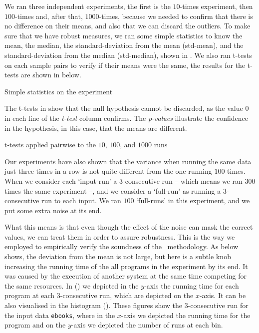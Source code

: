 We ran three independent experiments, the first is the $10$-times experiment, then $100$-times and, after that, $1000$-times, because we needed to confirm that there is no difference on their means, and also that we can discard the outliers. To make sure that we have robust measures, we ran some simple statistics to know the mean, the median, the standard-deviation from the mean (std-mean), and the standard-deviation from the median (std-median), shown in . We also ran t-tests on each sample pairs to verify if their means were the same, the results for the t-tests are shown in  below.

\begin{table}
  \centering
  \begin{tiny}
  
  \end{tiny}
  \caption{Simple statistics on the experiment}
  \label{tab:robustTest}
\end{table}

The t-tests in  show that the null hypothesis cannot be discarded, as the value $0$ in each line of the \emph{t-test} column confirms. The \emph{p-values} illustrate the confidence in the hypothesis, in this case, that the means are different.

\begin{table}
  \centering
  \begin{tiny}
  
  \end{tiny}
  \caption{t-tests applied pairwise to the $10$, $100$, and $1000$ runs}
  \label{tab:ttest}
\end{table}

Our experiments have also shown that the variance when running the same data just three times in a row is not quite different from the one running $100$ times. When we consider each `input-run' a $3$-consecutive run -- which means we ran $300$ times the same experiment --, and we consider a `full-run' as running a $3$-consecutive run to each input. We ran $100$ `full-runs' in this experiment, and we put some extra noise at its end.

What this means is that even though the effect of the noise can mask the correct values, we can treat them in order to assure robustness. This is the way we employed to empirically verify the soundness of the \CP\ methodology. As  below shows, the deviation from the mean is not large, but here is a subtle knob increasing the running time of the all programs in the experiment by its end. It was caused by the execution of another system at the same time competing for the same resources. In () we depicted in the $y$-axis the running time for each program at each 3-consecutive run, which are depicted on the $x$-axis. It can be also visualised in the histogram (). These figures show the $3$-consecutive run for the input data {\tt ebooks}, where in the $x$-axis we depicted the running time for the program and on the $y$-axis we depicted the number of runs at each bin.

